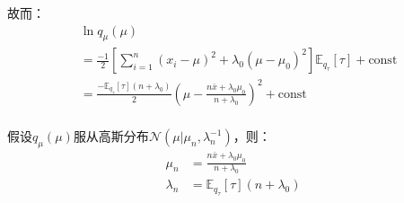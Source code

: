 故而：
\begin{displaymath}
\begin{split}
&\ln{q_\mu(\mu)}\\
&=   \frac{-1}{2} 
\left [ \sum_{i=1}^{n} (x_i - \mu)^2  +
\lambda_0 ( \mu - \mu_0)^2 \right ]
\mathbb{E}_{q_\tau} [\tau] +  \text{const}\\
&= \frac{- \mathbb{E}_{q_\tau} [\tau]  (n+\lambda_0)}{2} 
\left( \mu - \frac{n\bar{x}+\lambda_0\mu_0}{n+\lambda_0} \right) ^2
+  \text{const}\\
\end{split}
\end{displaymath}

假设$q_\mu(\mu)$服从高斯分布$\mathcal{N}(\mu | \mu_n, \lambda_n^{-1})$，则：
\begin{displaymath}
\begin{split}
\mu_n &= \frac{n\bar{x}+\lambda_0\mu_0}{n+\lambda_0}\\
\lambda_n &= \mathbb{E}_{q_\tau} [\tau](n+\lambda_0)\\
\end{split}
\end{displaymath}


